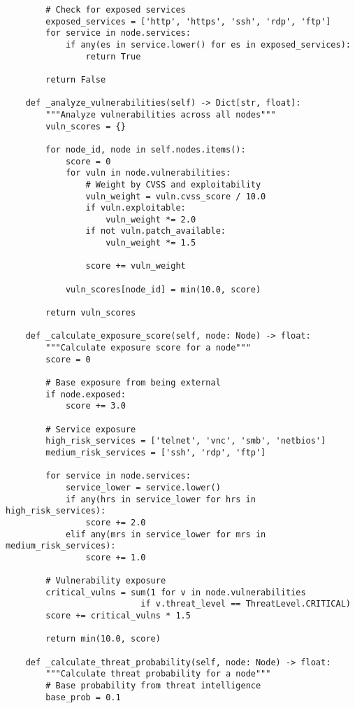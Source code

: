 \begin{verbatim}
        # Check for exposed services
        exposed_services = ['http', 'https', 'ssh', 'rdp', 'ftp']
        for service in node.services:
            if any(es in service.lower() for es in exposed_services):
                return True
        
        return False
    
    def _analyze_vulnerabilities(self) -> Dict[str, float]:
        """Analyze vulnerabilities across all nodes"""
        vuln_scores = {}
        
        for node_id, node in self.nodes.items():
            score = 0
            for vuln in node.vulnerabilities:
                # Weight by CVSS and exploitability
                vuln_weight = vuln.cvss_score / 10.0
                if vuln.exploitable:
                    vuln_weight *= 2.0
                if not vuln.patch_available:
                    vuln_weight *= 1.5
                
                score += vuln_weight
            
            vuln_scores[node_id] = min(10.0, score)
        
        return vuln_scores
    
    def _calculate_exposure_score(self, node: Node) -> float:
        """Calculate exposure score for a node"""
        score = 0
        
        # Base exposure from being external
        if node.exposed:
            score += 3.0
        
        # Service exposure
        high_risk_services = ['telnet', 'vnc', 'smb', 'netbios']
        medium_risk_services = ['ssh', 'rdp', 'ftp']
        
        for service in node.services:
            service_lower = service.lower()
            if any(hrs in service_lower for hrs in high_risk_services):
                score += 2.0
            elif any(mrs in service_lower for mrs in medium_risk_services):
                score += 1.0
        
        # Vulnerability exposure
        critical_vulns = sum(1 for v in node.vulnerabilities 
                           if v.threat_level == ThreatLevel.CRITICAL)
        score += critical_vulns * 1.5
        
        return min(10.0, score)
    
    def _calculate_threat_probability(self, node: Node) -> float:
        """Calculate threat probability for a node"""
        # Base probability from threat intelligence
        base_prob = 0.1
        

\end{verbatim}
